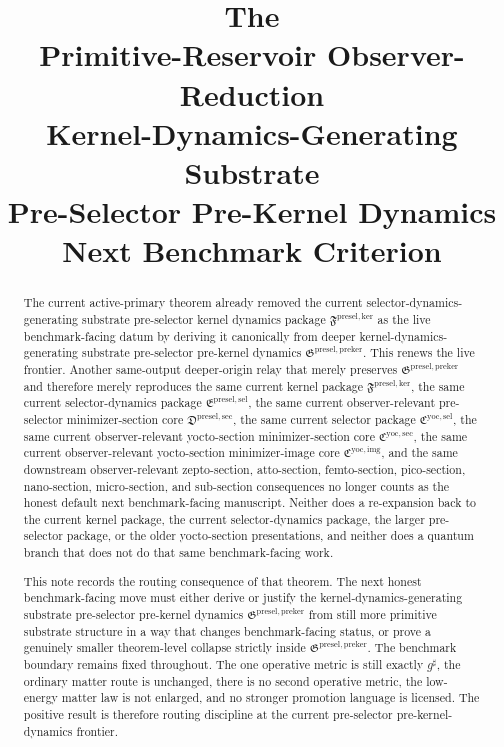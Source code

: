 \documentclass[11pt]{article}
\title{\textbf{The \TheoryName{}}\\[0.4em]
\large Primitive-Reservoir Observer-Reduction\\
\large Kernel-Dynamics-Generating Substrate\\
\large Pre-Selector Pre-Kernel Dynamics\\
\large Next Benchmark Criterion}
\author{}
\date{}
\newcommand{\CompletedMetric}{g^{\sharp}}
\newcommand{\PreKernelPackage}{\mathfrak G^{\mathrm{presel,preker}}}
\newcommand{\KernelPackage}{\mathfrak F^{\mathrm{presel,ker}}}
\newcommand{\PreSectionSelectorPackage}{\mathfrak E^{\mathrm{presel,sel}}}
\newcommand{\PreSelectorMinSectionCore}{\mathfrak D^{\mathrm{presel,sec}}}
\newcommand{\YoctoSelectorPackage}{\mathfrak C^{\mathrm{yoc,sel}}}
\newcommand{\YoctoImageCore}{\mathfrak C^{\mathrm{yoc,img}}}
\newcommand{\YoctoMinSectionCore}{\mathfrak C^{\mathrm{yoc,sec}}}
\begin{document}
\maketitle

\begin{abstract}
The current active-primary theorem already removed the current selector-dynamics-generating substrate pre-selector kernel dynamics package \(\KernelPackage\) as the live benchmark-facing datum by deriving it canonically from deeper kernel-dynamics-generating substrate pre-selector pre-kernel dynamics \(\PreKernelPackage\). This renews the live frontier. Another same-output deeper-origin relay that merely preserves \(\PreKernelPackage\) and therefore merely reproduces the same current kernel package \(\KernelPackage\), the same current selector-dynamics package \(\PreSectionSelectorPackage\), the same current observer-relevant pre-selector minimizer-section core \(\PreSelectorMinSectionCore\), the same current selector package \(\YoctoSelectorPackage\), the same current observer-relevant yocto-section minimizer-section core \(\YoctoMinSectionCore\), the same current observer-relevant yocto-section minimizer-image core \(\YoctoImageCore\), and the same downstream observer-relevant zepto-section, atto-section, femto-section, pico-section, nano-section, micro-section, and sub-section consequences no longer counts as the honest default next benchmark-facing manuscript. Neither does a re-expansion back to the current kernel package, the current selector-dynamics package, the larger pre-selector package, or the older yocto-section presentations, and neither does a quantum branch that does not do that same benchmark-facing work.

This note records the routing consequence of that theorem. The next honest benchmark-facing move must either derive or justify the kernel-dynamics-generating substrate pre-selector pre-kernel dynamics \(\PreKernelPackage\) from still more primitive substrate structure in a way that changes benchmark-facing status, or prove a genuinely smaller theorem-level collapse strictly inside \(\PreKernelPackage\). The benchmark boundary remains fixed throughout. The one operative metric is still exactly \(\CompletedMetric\), the ordinary matter route is unchanged, there is no second operative metric, the low-energy matter law is not enlarged, and no stronger promotion language is licensed. The positive result is therefore routing discipline at the current pre-selector pre-kernel-dynamics frontier.
\end{abstract}
\end{document}
